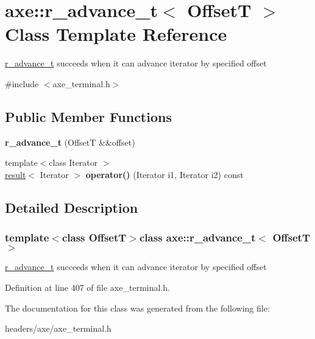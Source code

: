 \hypertarget{classaxe_1_1r__advance__t}{\section{axe\+:\+:r\+\_\+advance\+\_\+t$<$ Offset\+T $>$ Class Template Reference}
\label{classaxe_1_1r__advance__t}
}


\hyperlink{classaxe_1_1r__advance__t}{r\+\_\+advance\+\_\+t} succeeds when it can advance iterator by specified offset  




{\ttfamily \#include $<$axe\+\_\+terminal.\+h$>$}

\subsection*{Public Member Functions}
\begin{DoxyCompactItemize}
\item 
\hypertarget{classaxe_1_1r__advance__t_a5744e7f272d82ac12152a5e5e87dd938}{{\bfseries r\+\_\+advance\+\_\+t} (Offset\+T \&\&offset)}\label{classaxe_1_1r__advance__t_a5744e7f272d82ac12152a5e5e87dd938}

\item 
\hypertarget{classaxe_1_1r__advance__t_a318811518724db15973bb35b78c07650}{{\footnotesize template$<$class Iterator $>$ }\\\hyperlink{structaxe_1_1result}{result}$<$ Iterator $>$ {\bfseries operator()} (Iterator i1, Iterator i2) const }\label{classaxe_1_1r__advance__t_a318811518724db15973bb35b78c07650}

\end{DoxyCompactItemize}


\subsection{Detailed Description}
\subsubsection*{template$<$class Offset\+T$>$class axe\+::r\+\_\+advance\+\_\+t$<$ Offset\+T $>$}

\hyperlink{classaxe_1_1r__advance__t}{r\+\_\+advance\+\_\+t} succeeds when it can advance iterator by specified offset 

Definition at line 407 of file axe\+\_\+terminal.\+h.



The documentation for this class was generated from the following file\+:\begin{DoxyCompactItemize}
\item 
headers/axe/axe\+\_\+terminal.\+h\end{DoxyCompactItemize}

